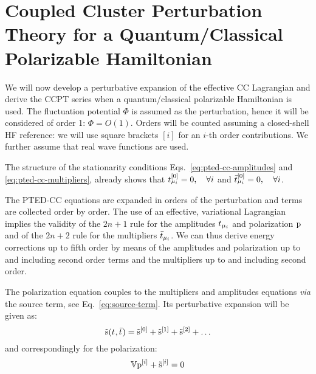 
\section[Coupled Cluster Perturbation Theory]{
Coupled Cluster Perturbation Theory for a Quantum/Classical Polarizable Hamiltonian}\label{sec:ccpt-polarizable}

We will now develop a perturbative expansion of the effective \acs{CC}
Lagrangian and derive the \acs{CC}\acs{PT} series when a
quantum/classical polarizable Hamiltonian is used.
The fluctuation potential $\Phi$ is assumed as the perturbation, hence
it will be considered of order 1: $\Phi = O(1)$.
Orders will be counted assuming a closed-shell \acs{HF} reference:
we will use square brackets $[i]$ for an $i$-th order contributions.
We further assume that real wave functions are used.

The structure of the stationarity conditions
Eqs.~\eqref{eq:pted-cc-amplitudes} and \eqref{eq:pted-cc-multipliers},
already shows that $t_{\mu_i}^{[0]} = 0, \quad \forall i$ and
$\bar{t}_{\mu_i}^{[0]} = 0, \quad \forall i$.

The \acs{PTED}-\acs{CC} equations are expanded in orders of the
perturbation and terms are collected order by order. The use of an
effective, variational Lagrangian implies the validity of the $2n+1$
rule for the amplitudes $t_{\mu_i}$ and polarization $\mathrm{p}$ and of the
$2n+2$ rule for the multipliers $\bar{t}_{\mu_i}$.
We can thus derive energy corrections up to fifth order by means of the
amplitudes and polarization up to and including second order terms and
the multipliers up to and including second order.

The polarization equation couples to the multipliers and amplitudes
equations \emph{via} the source term, see Eq.~\eqref{eq:source-term}.
Its perturbative expansion will be given as:
\begin{equation}\label{eq:source-term-pt}
  \tilde{\mathrm{s}}(t_{},\bar{t}_{}) =
  \tilde{\mathrm{s}}^{[0]}
  + \tilde{\mathrm{s}}^{[1]}
  + \tilde{\mathrm{s}}^{[2]}
  + \ldots
\end{equation}
and correspondingly for the polarization:
\begin{equation}\label{eq:pol-eq-pt}
  \mathbb{V}\mathrm{p}^{[i]} + \tilde{\mathrm{s}}^{[i]} = 0
\end{equation}


